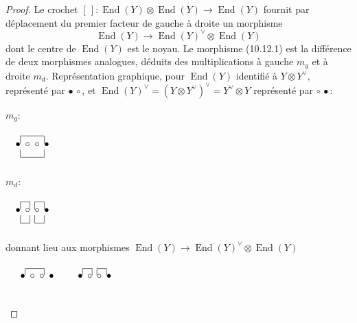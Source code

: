 \documentclass[11pt,a4paper]{article}
\theoremstyle{plain}
\theoremstyle{definition}
\DeclareMathOperator{\End}{End}
\begin{document}
\begin{proof}
Le crochet $[\,] : \End(Y) \otimes \End(Y) \to \End(Y)$ fournit par d\'eplacement du premier facteur de gauche \`a droite un morphisme
\begin{equation}
\End(Y) \to \End(Y)^\vee \otimes \End(Y) \tag{10.12.1}
\end{equation}
dont le centre de $\End(Y)$ est le noyau. Le morphisme (10.12.1) est la diff\'erence de deux morphismes analogues, d\'eduits des multiplications \`a gauche $m_g$ et \`a droite $m_d$. Repr\'esentation graphique, pour $\End(Y)$ identifi\'e \`a $Y \otimes Y^\vee$, repr\'esent\'e par $\bullet\,\circ$, et $\End(Y)^\vee = (Y \otimes Y^\vee)^\vee = Y^\vee \otimes Y$ repr\'esent\'e par $\circ\,\bullet$:

$m_g$:
\begin{center}
$\begin{array}{c}
\begin{picture}(60,30)
\put(5,15){$\bullet$} \put(15,15){$\circ$} \put(25,15){$\circ$} \put(35,15){$\bullet$}
\put(10,18){\line(0,1){8}} \put(10,26){\line(1,0){25}} \put(35,18){\line(0,1){8}}
\put(10,12){\line(0,-1){8}} \put(10,4){\line(1,0){25}} \put(35,12){\line(0,-1){8}}
\end{picture}
\end{array}$
\end{center}
$m_d$:
\begin{center}
$\begin{array}{c}
\begin{picture}(60,30)
\put(5,15){$\bullet$} \put(15,15){$\circ$} \put(25,15){$\circ$} \put(35,15){$\bullet$}
\put(10,18){\line(0,1){8}} \put(10,26){\line(1,0){10}} \put(20,18){\line(0,1){8}}
\put(25,18){\line(0,1){8}} \put(25,26){\line(1,0){10}} \put(35,18){\line(0,1){8}}
\put(10,12){\line(0,-1){8}} \put(10,4){\line(1,0){10}} \put(20,12){\line(0,-1){8}}
\put(25,12){\line(0,-1){8}} \put(25,4){\line(1,0){10}} \put(35,12){\line(0,-1){8}}
\end{picture}
\end{array}$
\end{center}
donnant lieu aux morphismes $\End(Y) \to \End(Y)^\vee \otimes \End(Y)$

\begin{center}
$\begin{array}{cc}
\begin{picture}(50,30)
\put(10,15){$\bullet$} \put(20,15){$\circ$} \put(30,15){$\circ$} \put(40,15){$\bullet$}
\put(15,18){\line(0,1){7}} \put(15,25){\line(1,0){20}} \put(35,18){\line(0,1){7}}
\end{picture}
&
\begin{picture}(50,30)
\put(10,15){$\bullet$} \put(20,15){$\circ$} \put(30,15){$\circ$} \put(40,15){$\bullet$}
\put(15,18){\line(0,1){7}} \put(15,25){\line(1,0){10}} \put(25,18){\line(0,1){7}}
\put(30,18){\line(0,1){7}} \put(30,25){\line(1,0){10}} \put(40,18){\line(0,1){7}}
\end{picture}
\end{array}$
\end{center}


\end{proof}
\end{document}
